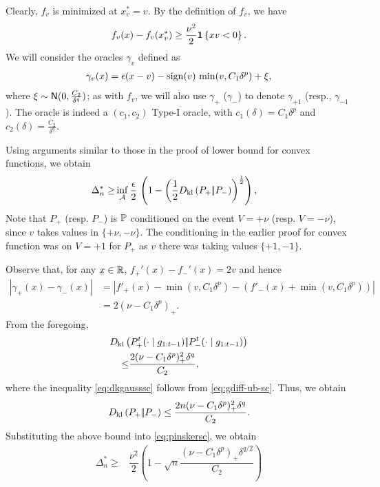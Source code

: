 Clearly, $f_v$ is minimized at $x^*_v = v$.
By the definition of $f_v$, we have
\begin{align}
  f_v(x) - f_v(x^*_v)
\ge  \dfrac{\nu^2}{2}  \indic{x v  < 0}. \label{eq:fv-lb-sc}
\end{align}
We will consider the oracles $\gamma_v$ defined as 
\begin{align}
 \gamma_v(x) = \epsilon(x-v) - \sign(v)\, \min(v,C_1 \delta^p) + \xi, \label{eq:oracle-1d}
\end{align}
where $\xi \sim \normal(0,\frac{C_2}{\delta^q})$; as with $f_v$, we will also use $\gamma_{+}$ ($\gamma_-$) 
to denote $\gamma_{+1}$ (resp., $\gamma_{-1}$).
The oracle is indeed a $(c_1,c_2)$ Type-I oracle, with $c_1(\delta)=C_1\delta^p$ and $c_2(\delta)=\frac{C_2}{\delta^q}$.

Using arguments similar to those in the proof of lower bound for convex functions, we obtain
\begin{align}
\Delta_n^{*} %
  \ge  &\inf_{\A} \dfrac{\epsilon }{2}  \,\left( 1 - \left(\frac12\dkl{P_{+}}{P_{-}}\right)^{\frac{1}{2}}\right), \label{eq:pinskersc}
\end{align}
Note that $P_+$ (resp. $P_-$) is $\P$ conditioned on the event $V=+\nu$ (resp. $V=-\nu$), since $v$ takes values in $\{+\nu,-\nu\}$. The conditioning in the earlier proof for convex function was on $V=+1$ for $P_+$ as $v$ there was taking values $\{+1,-1\}$.

Observe that, for any $x\in \R$, $f_+'(x) - f_-'(x) = 2v$ and hence
\begin{align}
 |\gamma_+(x) - \gamma_-(x)| 
& = | f'_+(x) - \min(v,C_1 \delta^p) - (f'_-(x)+\min(v,C_1 \delta^p)) | \nonumber \\
& = 2 (\nu - C_1 \delta^p)_+.
 \label{eq:gdiff-ub-sc}
\end{align}
From the foregoing, 
\begin{align}
 \MoveEqLeft \dkl{P_{+}^t(\cdot\mid g_{1:t-1})}{P_{-}^t(\cdot\mid g_{1:t-1})}\nonumber\\
 \le & \dfrac{2(\nu-C_1\delta^p)_+^2\delta^q}{C_2},\label{eq:dkgausssc}
\end{align}
where the inequality \eqref{eq:dkgausssc} follows from \eqref{eq:gdiff-ub-sc}.
Thus, we obtain
\begin{align}
\dkl{P_{+}}{P_{-}} \le \dfrac{2n(\nu-C_1\delta^p)_+^2 \delta^q}{C_2}.
\end{align}
Substituting the above bound into \eqref{eq:pinskersc}, we obtain 
\begin{align}
 \Delta_n^{*}
  \ge & \dfrac{\nu^2}{2} \left(1 - \sqrt{
    n}  \dfrac{(\nu-C_1\delta^p)_+\delta^{q/2}}{C_2}
  \right)\label{eq:final-lower-bd-sc}
\end{align}


